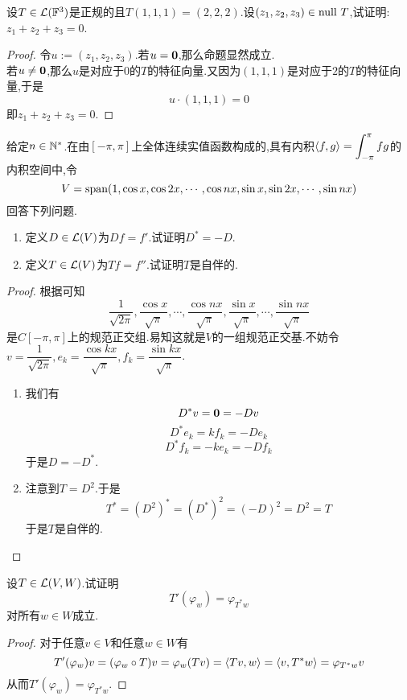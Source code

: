 \documentclass{ctexart}
\begin{document}
\begin{problem}[30.]
    设$T\in\mathcal{L}(\mathbb{F}^3)$是正规的且$T(1,1,1)=(2,2,2)$.设$(z_1,z_2,z_3)\in\text{null } T$,试证明:$z_1+z_2+z_3=0$.
\end{problem}
\begin{proof}
    令$u:=(z_1,z_2,z_3)$.若$u=\mathbf0$,那么命题显然成立.\\
    若$u\neq\mathbf0$,那么$u$是对应于$0$的$T$的特征向量.又因为$(1,1,1)$是对应于$2$的$T$的特征向量,于是
    \[u\cdot(1,1,1)=0\]
    即$z_1+z_2+z_3=0$.
\end{proof}
\begin{problem}[31.]
    给定$n\in\mathbb{N}^*$.在由$[-\pi,\pi]$上全体连续实值函数构成的,具有内积$\left\langle{f},{g}\right\rangle=\displaystyle\int_{-\pi}^{\pi}fg$的内积空间中,令
    \[V=\text{span}(1,\cos x,\cos 2x,\cdots,\cos nx,\sin x,\sin 2x,\cdots,\sin nx)\]
    回答下列问题.
    \begin{enumerate}[label=\tbf{(\arabic*)}]
        \item 定义$D\in\mathcal{L}(V)$为$Df=f'$.试证明$D^*=-D$.
        \item 定义$T\in\mathcal{L}(V)$为$Tf=f''$.试证明$T$是自伴的.
    \end{enumerate}
\end{problem}
\begin{proof}
    根据可知
    \[\dfrac{1}{\sqrt{2\pi}},\dfrac{\cos x}{\sqrt{\pi}},\cdots,\dfrac{\cos nx}{\sqrt{\pi}},\dfrac{\sin x}{\sqrt{\pi}},\cdots,\dfrac{\sin nx}{\sqrt{\pi}}\]
    是$C[-\pi,\pi]$上的规范正交组.易知这就是$V$的一组规范正交基.不妨令$v=\dfrac{1}{\sqrt{2\pi}},e_k=\dfrac{\cos kx}{\sqrt{\pi}},f_k=\dfrac{\sin kx}{\sqrt\pi}$.
    \begin{enumerate}[label=\tbf{(\arabic*)}]
        \item 我们有
            \[D^*v=\mathbf0=-Dv\]
            \[D^*e_k=kf_k=-De_k\]
            \[D^*f_k=-ke_k=-Df_k\]
            于是$D=-D^*$.
        \item 注意到$T=D^2$.于是
            \[T^*=\left(D^2\right)^*=\left(D^*\right)^2=(-D)^2=D^2=T\]
            于是$T$是自伴的.
    \end{enumerate}
\end{proof}
\begin{problem}[32.]
    设$T\in\mathcal{L}(V,W)$.试证明
    \[T'(\varphi_w)=\varphi_{T^*w}\]
    对所有$w\in W$成立.
\end{problem}
\begin{proof}
    对于任意$v\in V$和任意$w\in W$有
    \[T'(\varphi_w)v
    =(\varphi_w\circ T)v
    =\varphi_w(Tv)
    =\left\langle{Tv},{w}\right\rangle
    =\left\langle{v},{T^*w}\right\rangle
    =\varphi_{T^*w}v
    \]
    从而$T'(\varphi_w)=\varphi_{T^*w}$.
\end{proof}
\end{document}
